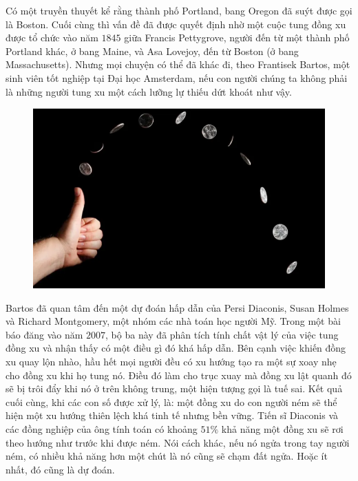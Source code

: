 \vspace*{180pt}

\begin{multicols}{2}
	Có một truyền thuyết  kể rằng thành phố Portland, bang Oregon đã suýt được gọi là Boston. Cuối cùng thì vấn đề đã được quyết định nhờ một cuộc tung đồng xu được tổ chức vào năm $1845$ giữa Francis Pettygrove, người đến từ một thành phố Portland khác, ở bang Maine, và Asa Lovejoy, đến từ Boston (ở bang Massachusetts). Nhưng mọi chuyện có thể đã khác đi, theo Frantisek Bartos, một sinh viên tốt nghiệp tại Đại học Amsterdam, nếu con người chúng ta  không phải là những người tung xu một cách lưỡng lự thiếu dứt khoát như vậy.
	\begin{figure}[H]
		\vspace*{-5pt}
		\centering
		\captionsetup{labelformat= empty, justification=centering}
		\includegraphics[width= 1\linewidth]{1111}
		\vspace*{-15pt}
	\end{figure}
	Bartos đã quan tâm đến một dự đoán hấp dẫn của Persi Diaconis, Susan Holmes và Richard Montgomery, một nhóm các nhà toán học người Mỹ. Trong một bài báo đăng vào năm $2007$, bộ ba này đã phân tích tính chất vật lý của việc tung đồng xu và nhận thấy có một điều gì đó khá hấp dẫn. Bên cạnh việc khiến đồng xu quay lộn nhào, hầu hết mọi người đều có xu hướng tạo ra một sự xoay nhẹ cho đồng xu khi họ tung nó. Điều đó làm cho trục xuay mà đồng xu lật quanh đó sẽ bị trôi đẩy khi nó ở trên không trung, một hiện tượng gọi là tuế sai.
	\vskip 0.01cm
	Kết quả cuối cùng, khi các con số được xử lý, là: một đồng xu do con người ném sẽ thể hiện một xu hướng thiên lệch khá tinh tế nhưng bền vững. Tiến sĩ Diaconis và các đồng nghiệp của ông tính toán có khoảng $51\%$ khả năng một đồng xu sẽ rơi theo hướng như trước khi được ném. Nói cách khác, nếu nó ngửa trong tay người ném, có nhiều khả năng hơn một chút là nó cũng sẽ chạm đất ngửa. Hoặc ít nhất, đó cũng là dự đoán.

\end{multicols}
